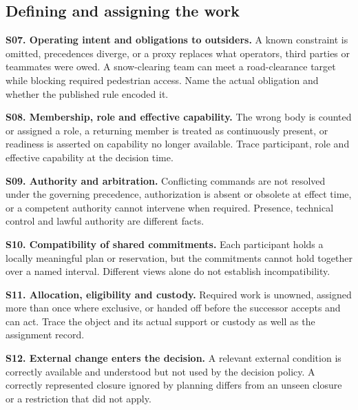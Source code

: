 \documentclass[11pt]{article}
\newcommand{\entry}[3]{\par\smallskip\noindent\textbf{#1. #2.} #3\par}
\begin{document}
\subsection{Defining and assigning the work}
\entry{S07}{Operating intent and obligations to outsiders}{A known constraint is omitted, precedences diverge, or a proxy replaces what operators, third parties or teammates were owed. A snow-clearing team can meet a road-clearance target while blocking required pedestrian access. Name the actual obligation and whether the published rule encoded it.}
\entry{S08}{Membership, role and effective capability}{The wrong body is counted or assigned a role, a returning member is treated as continuously present, or readiness is asserted on capability no longer available. Trace participant, role and effective capability at the decision time.}
\entry{S09}{Authority and arbitration}{Conflicting commands are not resolved under the governing precedence, authorization is absent or obsolete at effect time, or a competent authority cannot intervene when required. Presence, technical control and lawful authority are different facts.}
\entry{S10}{Compatibility of shared commitments}{Each participant holds a locally meaningful plan or reservation, but the commitments cannot hold together over a named interval. Different views alone do not establish incompatibility.}
\entry{S11}{Allocation, eligibility and custody}{Required work is unowned, assigned more than once where exclusive, or handed off before the successor accepts and can act. Trace the object and its actual support or custody as well as the assignment record.}
\entry{S12}{External change enters the decision}{A relevant external condition is correctly available and understood but not used by the decision policy. A correctly represented closure ignored by planning differs from an unseen closure or a restriction that did not apply.}
\end{document}
